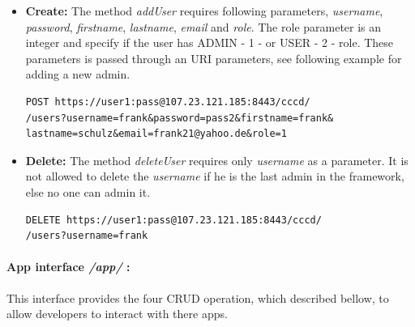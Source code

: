 \begin{itemize}
\item \textbf{Create:} The method \textit{addUser} requires following parameters, \textit{username}, \textit{password}, \textit{firstname}, \textit{lastname}, \textit{email} and \textit{role}.  The role parameter is an integer and specify if the user has ADMIN - 1 - or USER - 2 - role. These parameters is passed through an \ac{URI} parameters, see following example for adding a new admin.

\begin{code}
\begin{verbatim}
POST https://user1:pass@107.23.121.185:8443/cccd/
/users?username=frank&password=pass2&firstname=frank&
lastname=schulz&email=frank21@yahoo.de&role=1
\end{verbatim}
\end{code}

\item \textbf{Delete:} The method \textit{deleteUser} requires only \textit{username} as a parameter. It is not allowed to delete the \textit{username} if he is the last admin in the framework, else no one can admin it.

\begin{code}
\begin{verbatim}
DELETE https://user1:pass@107.23.121.185:8443/cccd/
/users?username=frank
\end{verbatim}
\end{code}

\end{itemize}


\paragraph{App interface \textit{/app/} :} This interface provides the four \ac{CRUD} operation, which described bellow, to allow developers to interact with there apps.

